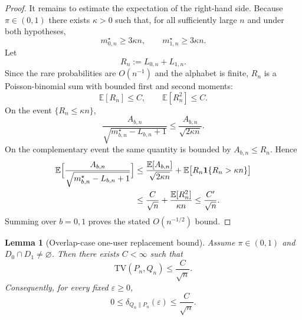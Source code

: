 \documentclass{article}
\newtheorem{lemma}[theorem]{Lemma}
\newcommand{\E}{\mathbb E}
\newcommand{\1}{\mathbf 1}
\begin{document}
\begin{proof}
It remains to estimate the expectation of the right-hand side. Because $\pi\in(0,1)$ there exists $\kappa>0$ such
that, for all sufficiently large $n$ and under both hypotheses,
\[
m_{0,n}^\star\ge 3\kappa n,
\qquad
m_{1,n}^\star\ge 3\kappa n.
\]
Let
\[
R_n:=L_{0,n}+L_{1,n}.
\]
Since the rare probabilities are $O(n^{-1})$ and the alphabet is finite, $R_n$ is a Poisson-binomial sum with
bounded first and second moments:
\[
\E[R_n]\le C,
\qquad
\E[R_n^2]\le C.
\]
On the event $\{R_n\le \kappa n\}$,
\[
\frac{A_{b,n}}{\sqrt{m_{b,n}^\star-L_{b,n}+1}}
\le \frac{A_{b,n}}{\sqrt{2\kappa n}}.
\]
On the complementary event the same quantity is bounded by $A_{b,n}\le R_n$. Hence
\begin{align*}
\E\Bigl[\frac{A_{b,n}}{\sqrt{m_{b,n}^\star-L_{b,n}+1}}\Bigr]
&\le \frac{\E[A_{b,n}]}{\sqrt{2\kappa n}}+\E\bigl[R_n\1\{R_n>\kappa n\}\bigr] \\
&\le \frac{C}{\sqrt n}+\frac{\E[R_n^2]}{\kappa n}
\le \frac{C'}{\sqrt n}.
\end{align*}
Summing over $b=0,1$ proves the stated $O(n^{-1/2})$ bound.
\end{proof}

\begin{lemma}[Overlap-case one-user replacement bound]
\label{lem:new-overlap-tv}
Assume $\pi\in(0,1)$ and $D_0\cap D_1\neq\varnothing$.
Then there exists $C<\infty$ such that
\[
\mathrm{TV}(P_n,Q_n)\le \frac{C}{\sqrt n}.
\]
Consequently, for every fixed $\varepsilon\ge 0$,
\[
0\le \delta_{Q_n\|P_n}(\varepsilon)\le \frac{C}{\sqrt n}.
\]
\end{lemma}
\end{document}

